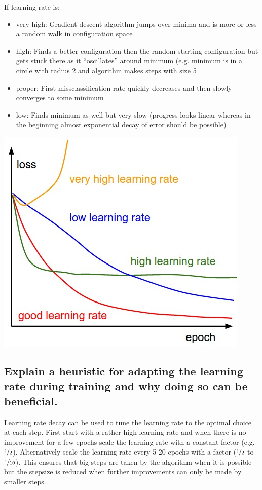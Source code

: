 If learning rate is:
\begin{itemize}
\item very high: Gradient descent algorithm jumps over minima and is more or less a random walk in configuration space
\item high: Finds a better configuration then the random starting configuration but gets stuck there as it ``oscillates'' around minimum (e.g. minimum is in a circle with radius 2 and algorithm makes steps with size 5
\end{itemize}
\begin{minipage}{0.6\textwidth}
\begin{itemize}
\item proper: First missclassification rate quickly decreases and then slowly converges to some minimum
\item low: Finds minimum as well but very slow (progress looks linear whereas in the beginning almost exponential decay of error should be possible)
\end{itemize}
\end{minipage}\begin{minipage}{0.4\textwidth}
\hspace{0.2cm}\includegraphics[width=\textwidth]{./img/learningrates.jpeg}
\end{minipage}
\subsection{Explain a heuristic for adapting the learning rate during training and why doing so can be beneficial.}
Learning rate decay can be used to tune the learning rate to the optimal choice at each step. First start with a rather high learning rate and when there is no improvement for a few epochs scale the learning rate with a constant factor (e.g. $\nicefrac 1 2$).
Alternatively scale the learning rate every 5-20 epochs with a factor ($\nicefrac 1 2$ to $\nicefrac 1 {10}$). This ensures that big steps are taken by the algorithm when it is possible but the stepsize is reduced when further improvements can only be made by smaller steps.
%
